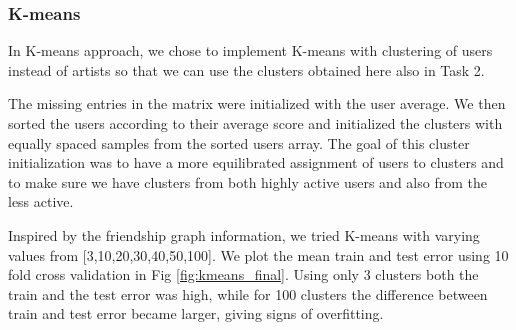 \subsubsection{K-means}
In K-means approach, we chose to implement K-means with clustering of users instead of artists so that we can use the clusters obtained here also in Task 2.

The missing entries in the matrix were initialized with the user average. We then sorted the users according to their average score and initialized the clusters with equally spaced samples from the sorted users array. The goal of this cluster initialization was to have a more equilibrated assignment of users to clusters and to make sure we have clusters from both highly active users and also from the less active.

Inspired by the friendship graph information, we tried K-means with varying values from [3,10,20,30,40,50,100]. We plot the mean train and test error using 10 fold cross validation in Fig \ref{fig:kmeans_final}. Using only 3 clusters both the train and the test error was high, while for 100 clusters the difference between train and test error became larger, giving signs of overfitting.



